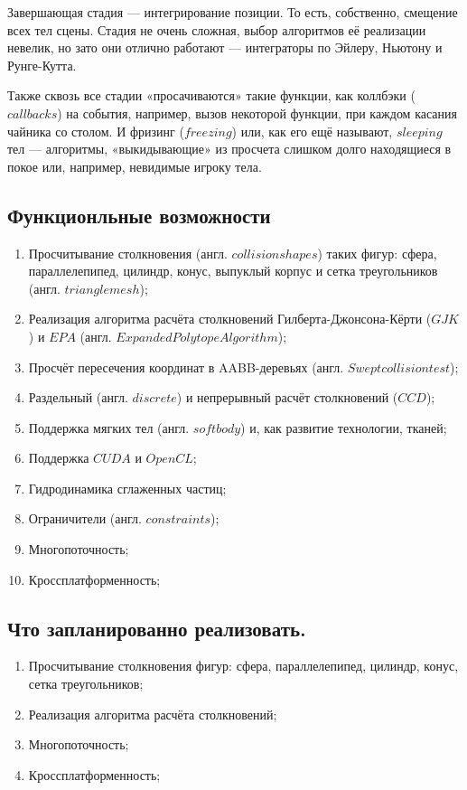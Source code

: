 \documentclass[12pt, oneside]{article}
\begin{document}
Завершающая стадия — интегрирование позиции. То есть, собственно, смещение всех тел сцены. Стадия не очень сложная, выбор алгоритмов её реализации невелик, но зато они отлично работают — интеграторы по Эйлеру, Ньютону и Рунге-Кутта.

Также сквозь все стадии «просачиваются» такие функции, как коллбэки ($callbacks$) на события, например, вызов некоторой функции, при каждом касания чайника со столом. И фризинг ($freezing$) или, как его ещё называют, $sleeping$ тел — алгоритмы, «выкидывающие» из просчета слишком долго находящиеся в покое или, например, невидимые игроку тела.

\subsection{Функционльные возможности}
\begin{enumerate} 
\item Просчитывание столкновения (англ. $collision shapes$) таких фигур: сфера, параллелепипед, цилиндр, конус, выпуклый корпус и сетка треугольников (англ. $triangle mesh$);
\item Реализация алгоритма расчёта столкновений Гилберта-Джонсона-Кёрти ($GJK$) и $EPA$ (англ. $Expanded Polytope Algorithm$);
\item Просчёт пересечения координат в AABB-деревьях (англ. $Swept collision test$);
\item Раздельный (англ. $discrete$) и непрерывный расчёт столкновений ($CCD$);
\item Поддержка мягких тел (англ. $soft body$) и, как развитие технологии, тканей;
\item Поддержка $CUDA$ и $OpenCL$;
\item Гидродинамика сглаженных частиц;
\item Ограничители (англ. $constraints$);
\item Многопоточность;
\item Кроссплатформенность;
\end{enumerate}

\subsection{Что запланированно реализовать.}
\begin{enumerate} 
\item Просчитывание столкновения фигур: сфера, параллелепипед, цилиндр, конус, сетка треугольников;
\item Реализация алгоритма расчёта столкновений;
\item Многопоточность;
\item Кроссплатформенность;
\end{enumerate}
\end{document}
